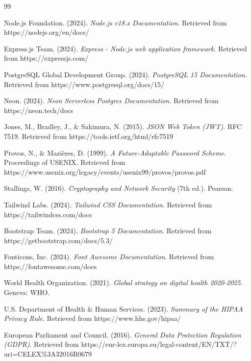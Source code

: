 \renewcommand{\bibname}{References}

\begin{thebibliography}{99}

Node.js Foundation. (2024). \textit{Node.js v18.x Documentation}. Retrieved from https://nodejs.org/en/docs/

Express.js Team. (2024). \textit{Express - Node.js web application framework}. Retrieved from https://expressjs.com/

PostgreSQL Global Development Group. (2024). \textit{PostgreSQL 15 Documentation}. Retrieved from https://www.postgresql.org/docs/15/

Neon. (2024). \textit{Neon Serverless Postgres Documentation}. Retrieved from https://neon.tech/docs

Jones, M., Bradley, J., \& Sakimura, N. (2015). \textit{JSON Web Token (JWT)}. RFC 7519. Retrieved from https://tools.ietf.org/html/rfc7519

Provos, N., \& Mazi{\`e}res, D. (1999). \textit{A Future-Adaptable Password Scheme}. Proceedings of USENIX. Retrieved from https://www.usenix.org/legacy/events/usenix99/provos/provos.pdf

Stallings, W. (2016). \textit{Cryptography and Network Security} (7th ed.). Pearson.

Tailwind Labs. (2024). \textit{Tailwind CSS Documentation}. Retrieved from https://tailwindcss.com/docs

Bootstrap Team. (2024). \textit{Bootstrap 5 Documentation}. Retrieved from https://getbootstrap.com/docs/5.3/

Fonticons, Inc. (2024). \textit{Font Awesome Documentation}. Retrieved from https://fontawesome.com/docs

World Health Organization. (2021). \textit{Global strategy on digital health 2020-2025}. Geneva: WHO.

U.S. Department of Health \& Human Services. (2023). \textit{Summary of the HIPAA Privacy Rule}. Retrieved from https://www.hhs.gov/hipaa/

European Parliament and Council. (2016). \textit{General Data Protection Regulation (GDPR)}. Retrieved from https://eur-lex.europa.eu/legal-content/EN/TXT/?uri=CELEX\%3A32016R0679


\end{thebibliography}
